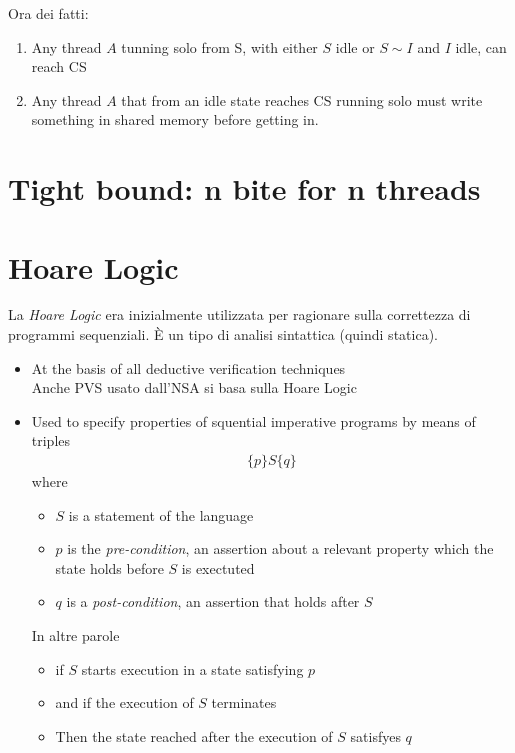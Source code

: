 \documentclass{article}
\begin{document}
Ora dei fatti:
\begin{enumerate}
    \item Any thread $A$ tunning solo from S, with either $S$ idle or $S\sim I$ and $I$ idle, can reach CS
    \item Any thread $A$ that from an idle state reaches CS running solo must write something in shared memory before getting in.
\end{enumerate}

\section{Tight bound: n bite for n threads}

\section{Hoare Logic}
La \textit{Hoare Logic} era inizialmente utilizzata per ragionare sulla correttezza di programmi sequenziali. È un tipo di analisi sintattica (quindi statica).

\begin{itemize}
    \item At the basis of all deductive verification techniques \\
        Anche PVS usato dall'NSA si basa sulla Hoare Logic
    \item Used to specify properties of squential imperative programs by means of triples
        \begin{align*}
            \{p\} S \{q\}
        \end{align*}
        where 
        \begin {itemize}
            \item $S$ is a statement of the language
            \item $p$ is the \textit{pre-condition}, an assertion about a relevant property which the state holds before $S$ is exectuted
            \item $q$ is a \textit{post-condition}, an assertion that holds after $S$
        \end{itemize}
        In altre parole
        \begin{itemize}
            \item if $S$ starts execution in a state satisfying $p$
            \item and if the execution of $S$ terminates
            \item Then the state reached after the execution of $S$ satisfyes $q$
        \end{itemize}
\end{itemize}
\end{document}
